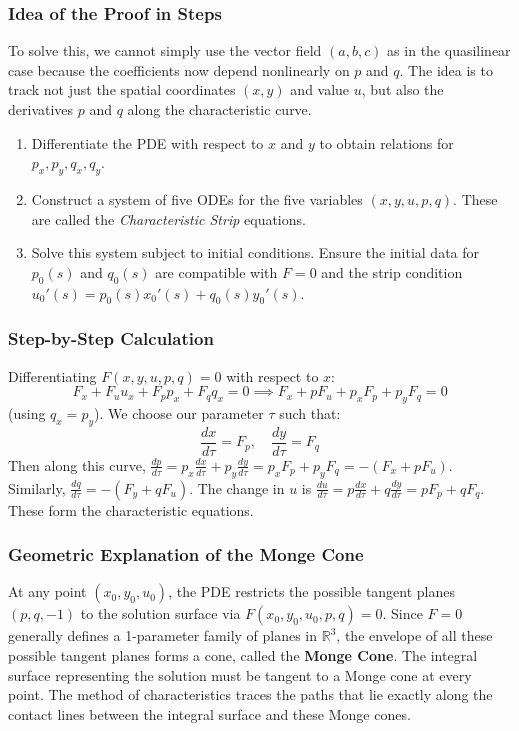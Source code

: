 \documentclass[11pt]{article}
\theoremstyle{plain}
\theoremstyle{definition}
\theoremstyle{remark}
\begin{document}
\subsubsection{Idea of the Proof in Steps}
To solve this, we cannot simply use the vector field $(a,b,c)$ as in the quasilinear case because the coefficients now depend nonlinearly on $p$ and $q$. The idea is to track not just the spatial coordinates $(x,y)$ and value $u$, but also the derivatives $p$ and $q$ along the characteristic curve.
\begin{enumerate}
    \item Differentiate the PDE with respect to $x$ and $y$ to obtain relations for $p_x, p_y, q_x, q_y$.
    \item Construct a system of five ODEs for the five variables $(x, y, u, p, q)$. These are called the \textit{Characteristic Strip} equations.
    \item Solve this system subject to initial conditions. Ensure the initial data for $p_0(s)$ and $q_0(s)$ are compatible with $F=0$ and the strip condition $u_0'(s) = p_0(s) x_0'(s) + q_0(s) y_0'(s)$.
\end{enumerate}

\subsubsection{Step-by-Step Calculation}
Differentiating $F(x,y,u,p,q)=0$ with respect to $x$:
$$ F_x + F_u u_x + F_p p_x + F_q q_x = 0 \implies F_x + p F_u + p_x F_p + p_y F_q = 0 $$
(using $q_x = p_y$). We choose our parameter $\tau$ such that:
$$ \frac{dx}{d\tau} = F_p, \quad \frac{dy}{d\tau} = F_q $$
Then along this curve, $\frac{dp}{d\tau} = p_x \frac{dx}{d\tau} + p_y \frac{dy}{d\tau} = p_x F_p + p_y F_q = -(F_x + p F_u)$.
Similarly, $\frac{dq}{d\tau} = -(F_y + q F_u)$.
The change in $u$ is $\frac{du}{d\tau} = p \frac{dx}{d\tau} + q \frac{dy}{d\tau} = p F_p + q F_q$.
These form the characteristic equations.

\subsubsection{Geometric Explanation of the Monge Cone}
At any point $(x_0, y_0, u_0)$, the PDE restricts the possible tangent planes $(p,q,-1)$ to the solution surface via $F(x_0, y_0, u_0, p, q) = 0$. Since $F=0$ generally defines a 1-parameter family of planes in $\mathbb{R}^3$, the envelope of all these possible tangent planes forms a cone, called the \textbf{Monge Cone}. 
The integral surface representing the solution must be tangent to a Monge cone at every point. The method of characteristics traces the paths that lie exactly along the contact lines between the integral surface and these Monge cones.
\end{document}

